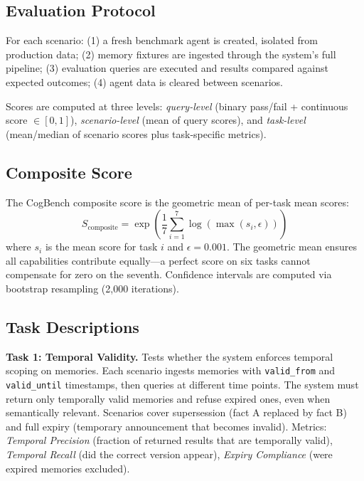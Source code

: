 \documentclass{article}
\begin{document}
\subsection{Evaluation Protocol}

For each scenario: (1) a fresh benchmark agent is created, isolated from production data; (2) memory fixtures are ingested through the system's full pipeline; (3) evaluation queries are executed and results compared against expected outcomes; (4) agent data is cleared between scenarios.

Scores are computed at three levels: \emph{query-level} (binary pass/fail + continuous score $\in [0,1]$), \emph{scenario-level} (mean of query scores), and \emph{task-level} (mean/median of scenario scores plus task-specific metrics).

\subsection{Composite Score}

The CogBench composite score is the geometric mean of per-task mean scores:
\begin{equation}
S_{\text{composite}} = \exp\left(\frac{1}{7}\sum_{i=1}^{7} \log(\max(s_i, \epsilon))\right)
\end{equation}
where $s_i$ is the mean score for task $i$ and $\epsilon = 0.001$. The geometric mean ensures all capabilities contribute equally---a perfect score on six tasks cannot compensate for zero on the seventh. Confidence intervals are computed via bootstrap resampling (2,000 iterations).

\subsection{Task Descriptions}

\textbf{Task 1: Temporal Validity.} Tests whether the system enforces temporal scoping on memories. Each scenario ingests memories with \texttt{valid\_from} and \texttt{valid\_until} timestamps, then queries at different time points. The system must return only temporally valid memories and refuse expired ones, even when semantically relevant. Scenarios cover supersession (fact A replaced by fact B) and full expiry (temporary announcement that becomes invalid). Metrics: \emph{Temporal Precision} (fraction of returned results that are temporally valid), \emph{Temporal Recall} (did the correct version appear), \emph{Expiry Compliance} (were expired memories excluded).
\end{document}

